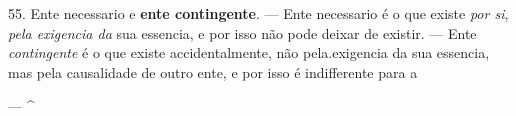  55. Ente necessario e \textbf{ente contingente}. --- Ente necessario é o que existe \emph{por si}, \emph{pela exigencia da} sua essencia, e por isso não pode deixar de existir. --- Ente \emph{contingente} é o que existe accidentalmente, não pela.exigencia da sua essencia, mas pela causalidade de outro ente, e por isso é indifferente para a

--- \textasciicircum{} 